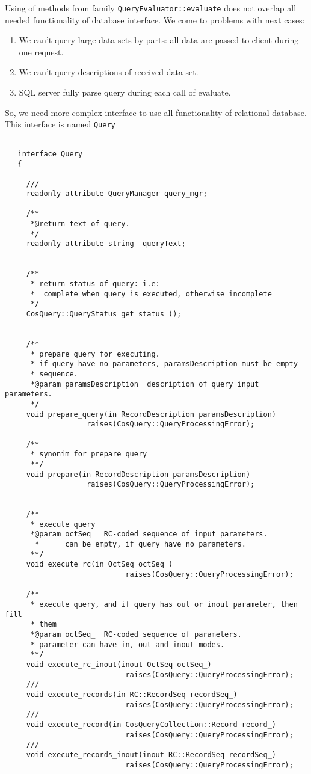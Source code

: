 \documentclass[10pt]{article}
\begin{document}
 Using of methods from family \verb|QueryEvaluator::evaluate| does not
overlap all needed functionality of database interface. 
 We come to problems with next cases:
 \begin{enumerate}
   \item We can't query large data sets by parts: all data are passed to client
  during one request.
   \item We can't query descriptions of received data set.
   \item SQL server fully parse query during each call of evaluate.
 \end{enumerate}

 So, we need more complex interface to use  all functionality of 
 relational database. This interface is named \verb|Query|

\begin{verbatim}

   interface Query
   {

     ///
     readonly attribute QueryManager query_mgr;

     /**
      *@return text of query.
      */
     readonly attribute string  queryText;
 

     /**
      * return status of query: i.e: 
      *  complete when query is executed, otherwise incomplete
      */
     CosQuery::QueryStatus get_status ();


     /**
      * prepare query for executing.
      * if query have no parameters, paramsDescription must be empty 
      * sequence.
      *@param paramsDescription  description of query input parameters.
      */
     void prepare_query(in RecordDescription paramsDescription)
                   raises(CosQuery::QueryProcessingError);

     /**
      * synonim for prepare_query 
      **/
     void prepare(in RecordDescription paramsDescription)
                   raises(CosQuery::QueryProcessingError);


     /**
      * execute query
      *@param octSeq_  RC-coded sequence of input parameters.
       *      can be empty, if query have no parameters.
      **/
     void execute_rc(in OctSeq octSeq_)
                            raises(CosQuery::QueryProcessingError);

     /**
      * execute query, and if query has out or inout parameter, then fill
      * them
      *@param octSeq_  RC-coded sequence of parameters.
      * parameter can have in, out and inout modes.
      **/
     void execute_rc_inout(inout OctSeq octSeq_)
                            raises(CosQuery::QueryProcessingError);
     /// 
     void execute_records(in RC::RecordSeq recordSeq_)
                            raises(CosQuery::QueryProcessingError);
     ///
     void execute_record(in CosQueryCollection::Record record_)
                            raises(CosQuery::QueryProcessingError);
     ///
     void execute_records_inout(inout RC::RecordSeq recordSeq_)
                            raises(CosQuery::QueryProcessingError);
     

\end{verbatim}
\end{document}
